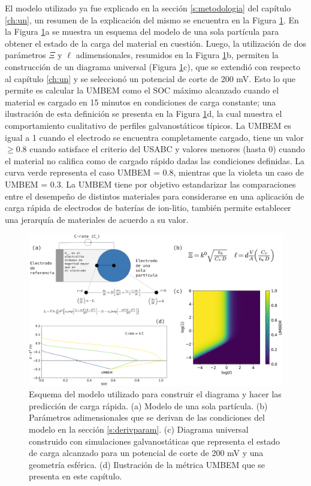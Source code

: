 El modelo utilizado ya fue explicado en la sección \ref{s:metodologia} del
capítulo \ref{ch:un}, un resumen de la explicación del mismo se encuentra 
en la Figura \ref{fig:explicacion}. En la Figura \ref{fig:explicacion}a se 
muestra un esquema del modelo de una sola partícula para obtener el estado
de la carga del material en cuestión. Luego, la utilización de dos parámetros
$\Xi$ y $\ell$ adimensionales, resumidos en la Figura \ref{fig:explicacion}b,
permiten la construcción de un diagrama universal (Figura 
\ref{fig:explicacion}c), que se extendió con respecto al capítulo \ref{ch:un}
y se seleccionó un potencial de corte de 200 mV. Esto lo que permite es 
calcular la UMBEM como el SOC máximo alcanzado cuando el material es cargado
en 15 minutos en condiciones de carga constante; una ilustración de esta 
definición se presenta en la Figura \ref{fig:explicacion}d, la cual muestra 
el comportamiento cualitativo de perfiles galvanostáticos típicos. La UMBEM
es igual a 1 cuando el electrodo se encuentra completamente cargado, tiene
un valor $\geq 0.8$ cuando satisface el criterio del USABC \cite{USABC} y
valores menores (hasta 0) cuando el material no califica como de cargado 
rápido dadas las condiciones definidas. La curva verde representa el caso 
UMBEM = 0.8, mientras que la violeta un caso de UMBEM = 0.3. La UMBEM 
tiene por objetivo estandarizar las comparaciones entre el desempeño de distintos 
materiales para considerarse en una aplicación de carga rápida de electrodos
de baterías de ion-litio, también permite establecer una jerarquía de 
materiales de acuerdo a su valor.
\begin{figure}[h!]
    \centering
    \includegraphics[width=\textwidth]{FastCharging/umbem/explicacion/explicacion.png}
    \caption{Esquema del modelo utilizado para construir el diagrama y hacer 
    las predicción de carga rápida. (a) Modelo de una sola partícula. (b) 
    Parámetros adimensionales que se derivan de las condiciones del modelo 
    en la sección \ref{s:derivparam}. (c) Diagrama universal construido con 
    simulaciones galvanostáticas que representa el estado de carga alcanzado para 
    un potencial de corte de 200 mV y una geometría esférica. (d) Ilustración
    de la métrica UMBEM que se presenta en este capítulo.}
    \label{fig:explicacion}
\end{figure}


